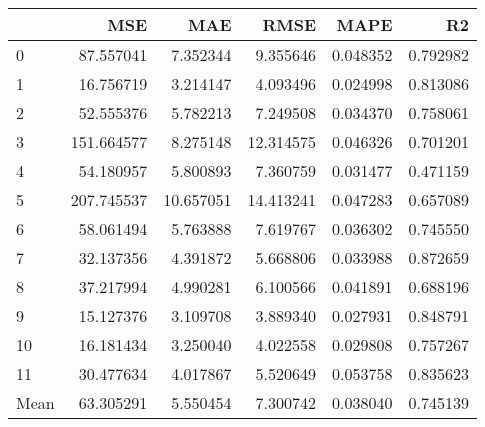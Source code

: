 \begin{tabular}{lrrrrr}
\toprule
 & MSE & MAE & RMSE & MAPE & R2 \\
\midrule
0 & 87.557041 & 7.352344 & 9.355646 & 0.048352 & 0.792982 \\
1 & 16.756719 & 3.214147 & 4.093496 & 0.024998 & 0.813086 \\
2 & 52.555376 & 5.782213 & 7.249508 & 0.034370 & 0.758061 \\
3 & 151.664577 & 8.275148 & 12.314575 & 0.046326 & 0.701201 \\
4 & 54.180957 & 5.800893 & 7.360759 & 0.031477 & 0.471159 \\
5 & 207.745537 & 10.657051 & 14.413241 & 0.047283 & 0.657089 \\
6 & 58.061494 & 5.763888 & 7.619767 & 0.036302 & 0.745550 \\
7 & 32.137356 & 4.391872 & 5.668806 & 0.033988 & 0.872659 \\
8 & 37.217994 & 4.990281 & 6.100566 & 0.041891 & 0.688196 \\
9 & 15.127376 & 3.109708 & 3.889340 & 0.027931 & 0.848791 \\
10 & 16.181434 & 3.250040 & 4.022558 & 0.029808 & 0.757267 \\
11 & 30.477634 & 4.017867 & 5.520649 & 0.053758 & 0.835623 \\
Mean & 63.305291 & 5.550454 & 7.300742 & 0.038040 & 0.745139 \\
\bottomrule
\end{tabular}
